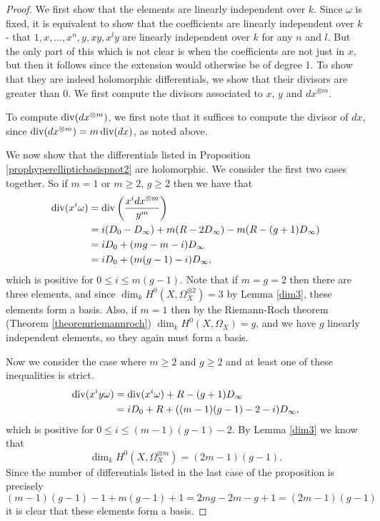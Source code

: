     \begin{proof}
    We first show that the elements are linearly independent over $k$.
    Since $\omega$ is fixed, it is equivalent to show that the coefficients are linearly independent over $k$ - \ie that $1,x,\ldots ,x^n, y, xy, x^ly$ are linearly independent over $k$ for any $n$ and $l$.
    But the only part of this which is not clear is when the coefficients are not just in $x$, but then it follows since the extension would otherwise be of degree 1.
    To show that they are indeed holomorphic differentials, we show that their divisors are greater than $0$.
    We first compute the divisors associated to $x$, $y$ and $dx^{\otimes m}$.
    
    To compute $\operatorname{div} (dx^{\otimes m})$, we first note that it suffices to compute the divisor of $dx$, since $\operatorname{div} (dx^{\otimes m}) =m\operatorname{div} (dx)$, as noted above.
    
    
    We now show that the differentials listed in Proposition \ref{prophyperellipticbasispnot2} are holomorphic.
    We consider the first two cases together.
    So if $m=1$ or $m\geq 2$, $g\geq 2$ then we have that
        \begin{align*}
        \operatorname{div}(x^i\omega) & =  \operatorname{div} \left( \frac{x^idx^{\otimes m}}{y^m} \right)\\ 
        & =  i(D_0 -D_\infty) + m(R-2D_\infty) -m(R-(g+1)D_\infty) \\
        & =  iD_0 + (mg -m -i)D_\infty \\
        & =  iD_0 + (m(g-1) -i)D_\infty,
        \end{align*}
    which is positive for $0\leq i \leq m(g-1)$.
    Note that if $m=g=2$ then there are three elements, and since $\dim_kH^0(X,\Omega_X^{\otimes 2})=3$ by Lemma \ref{dim3}, these elements form a basis.
    Also, if $m=1$ then by the Riemann-Roch theorem (Theorem \ref{theoremriemannroch}) $\dim_k H^0(X,\Omega_X)=g$, and we have $g$ linearly independent elements, so they again must form a basis.
    
    
    
    Now we consider the case where $m\geq 2$ and $g \geq 2$ and at least one of these inequalities is strict.
        \begin{align*}
        \operatorname{div} (x^iy\omega) & =  \operatorname{div}(x^i\omega) + R -(g+1)D_\infty \\
        & =  iD_0 + R +((m-1)(g-1)-2-i)D_\infty,
        \end{align*}
    which is positive for $0\leq i \leq (m-1)(g-1)-2$.
    By Lemma \ref{dim3} we know that 
        \[
        \dim_kH^0(X,\Omega_X^{\otimes m}) = (2m-1)(g-1).
        \]
    Since the number of differentials listed in the last case of the proposition is precisely
        \[
        (m-1)(g-1)-1 + m(g-1) +1 = 2mg -2m -g + 1 = (2m-1)(g-1)
        \]
    it is clear that these elements form a basis.
    \end{proof}


